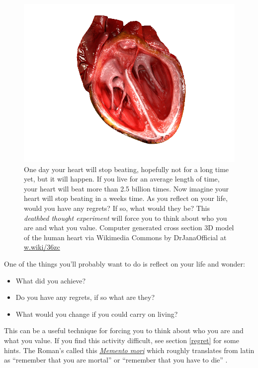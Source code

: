 \documentclass[
]{book}
\providecommand{\tightlist}{%
  \setlength{\itemsep}{0pt}\setlength{\parskip}{0pt}}
\begin{document}
\begin{figure}

{\centering \includegraphics[width=1\linewidth]{images/your-beating-heart} 

}

\caption{One day your heart will stop beating, hopefully not for a long time yet, but it will happen. If you live for an average length of time, your heart will beat more than 2.5 billion times. Now imagine your heart will stop beating in a weeks time. As you reflect on your life, would you have any regrets? If so, what would they be? This \emph{deathbed thought experiment} will force you to think about who you are and what you value. Computer generated cross section 3D model of the human heart via Wikimedia Commons by DrJanaOfficial at \href{https://w.wiki/36zc}{w.wiki/36zc}}\label{fig:heart-fig}
\end{figure}



One of the things you'll probably want to do is reflect on your life and wonder:

\begin{itemize}
\tightlist
\item
  What did you achieve?
\item
  Do you have any regrets, if so what are they?
\item
  What would you change if you could carry on living?
\end{itemize}

This can be a useful technique for forcing you to think about who you are and what you value. If you find this activity difficult, see section \ref{regret} for some hints. The Roman's called this \emph{\href{https://en.wikipedia.org/wiki/Memento_mori}{Memento mori}} which roughly translates from latin as ``remember that you are mortal'' or ``remember that you have to die'' .
\end{document}
